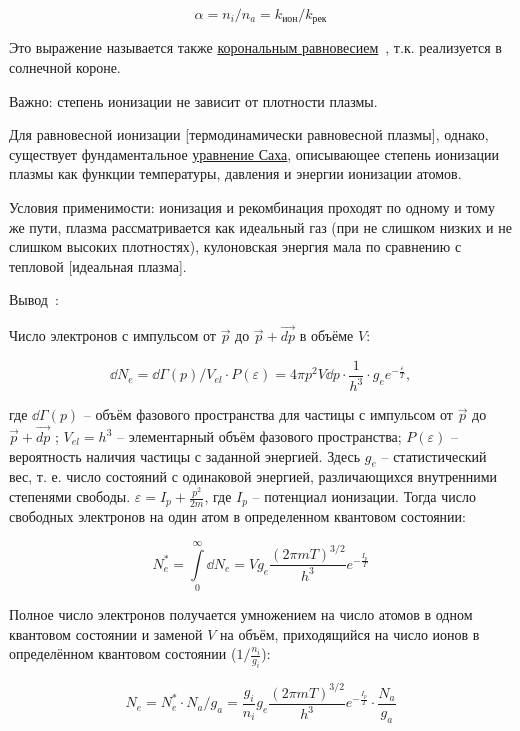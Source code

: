 \documentclass[10pt, a4paper]{article}
\begin{document}
\begin{equation}
	\alpha = n_i/n_a = k_{\text{ион}}/k_{\text{рек}}
\end{equation}

Это выражение называется также \uline{корональным равновесием}~\cite{kotelnikov}, т.к. реализуется в солнечной короне. 

Важно: степень ионизации не зависит от плотности плазмы.

Для равновесной ионизации [термодинамически равновесной плазмы], однако, существует фундаментальное \uline{уравнение Саха}, описывающее степень ионизации плазмы как функции температуры, давления и энергии ионизации атомов.

Условия применимости: ионизация и рекомбинация проходят по одному и тому же пути, плазма рассматривается как идеальный газ (при не слишком низких и не слишком высоких плотностях), кулоновская энергия мала по сравнению с тепловой [идеальная плазма]. 

Вывод~\cite{frank}:

Число электронов с импульсом от $\vec{p}$ до $\vec{p}+\vec{dp}$ в объёме $V$:

\begin{equation*}
	\dd N_e = \dd\Gamma(p)/V_{el} \cdot P(\varepsilon) = 4\pi p^2 V\dd p\cdot \frac{1}{h^3} \cdot g_e e^{-\frac{\varepsilon}{T}},
\end{equation*}

где $\dd\Gamma(p)$ -- объём фазового пространства для частицы с импульсом от $\vec{p}$ до $\vec{p}+\vec{dp}$ ; $V_{el} = h^3$ -- элементарный объём фазового пространства; $P(\varepsilon)$ -- вероятность наличия частицы с заданной энергией. Здесь $g_e$ -- статистический вес, т. е. число состояний с одинаковой энергией, различающихся внутренними степенями свободы. $\varepsilon = I_p + \frac{p^2}{2m}$, где $I_p$ -- потенциал ионизации. Тогда число свободных электронов на один атом в определенном
квантовом состоянии:

\begin{equation*}
	N_e^{*} = \int\limits_{0}^{\infty} \dd N_e = Vg_e\frac{(2\pi mT)^{3/2}}{h^3}e^{-\frac{I_p}{T}}
\end{equation*}

Полное число электронов получается умножением на число атомов в одном квантовом состоянии и заменой $V$ на объём, приходящийся на число ионов в определённом квантовом состоянии ($1/\frac{n_i}{g_i}$):

\begin{equation*}
	N_e = N_e^{*} \cdot N_a/g_a = \frac{g_i}{n_i} g_e\frac{(2\pi mT)^{3/2}}{h^3}e^{-\frac{I_p}{T}} \cdot \frac{N_a}{g_a}
\end{equation*}
\end{document}
